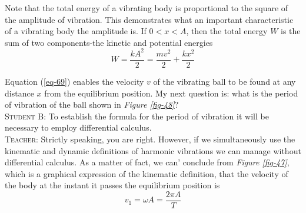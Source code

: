 \documentclass[a4paper,sfsidenotes]{tufte-book}
\begin{document}
Note that the total energy of a vibrating body is proportional to the square of the amplitude of vibration. This demonstrates what an important characteristic of a vibrating body the amplitude is.
If $0 < x < A$, then the total energy $W$ is the sum of two components-the kinetic and potential energies \\
\begin{equation}
W = \frac{kA^{2}}{2} = \frac{m v^{2}}{2} + \frac{k x^{2}}{2}
\label{eq-69}
\end{equation}

Equation (\ref{eq-69}) enables the velocity $v$ of the vibrating ball to be found at any distance $x$ from the equilibrium position. My next question is: what is the period of vibration of the ball shown in \emph{Figure \ref{fig-48}}?
\\
\textsc{Student B:} To establish the formula for the period of vibration it will be necessary to employ differential calculus.
\\
\textsc{Teacher:} Strictly speaking, you are right. However, if we simultaneously use the kinematic and dynamic definitions of harmonic vibrations we can manage without differential calculus. As a matter of fact, we can' conclude from \emph{Figure \ref{fig-47}}, which is a graphical expression of the kinematic definition, that the velocity of the body at the instant it passes the equilibrium position is \\
\begin{equation}
v_{1} = \omega A =  \frac{2 \pi A}{T}
\label{eq-70}
\end{equation}
\end{document}
